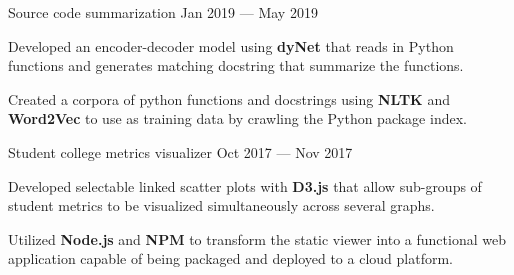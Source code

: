 
\vspace{-0.1cm}

\begin{cventries}

  \cventry
    {} %
    {Source code summarization \href{https://github.com/pauldhein/code-summarization}{\faExternalLink}} %
    {Jan 2019 --- May 2019} %
    {} %
    {
      \vspace{-1cm}
      \begin{cvitems} %
        \item Developed an encoder-decoder model using \textbf{dyNet} that reads in Python functions and generates matching docstring that summarize the functions.
        \item Created a corpora of python functions and docstrings using \textbf{NLTK} and \textbf{Word2Vec} to use as training data by crawling the Python package index.
      \end{cvitems}
    }
  \vspace{.2cm}
  \cventry
    {} %
    {Student college metrics visualizer \href{https://github.com/pauldhein/student-data-visualizer}{\faExternalLink}} %
    {Oct 2017 --- Nov 2017} %
    {} %
    {
      \vspace{-1cm}
      \begin{cvitems} %
        \item Developed selectable linked scatter plots with \textbf{D3.js} that allow sub-groups of student metrics to be visualized simultaneously across several graphs.
        \item Utilized \textbf{Node.js} and \textbf{NPM} to transform the static viewer into a functional web application capable of being packaged and deployed to a cloud platform.
      \end{cvitems}
    }

\end{cventries}
